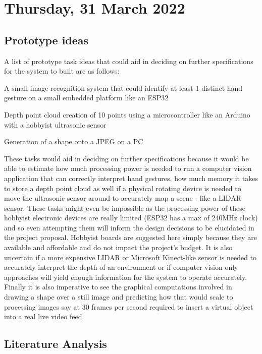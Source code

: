 \section[2022/03/31]{Thursday, 31 March 2022}

\subsection{Prototype ideas}

A list of prototype task ideas that could aid in deciding on further specifications for the system to built are as follows:
\begin{compactitem}
    \item A small image recognition system that could identify at least 1 distinct hand gesture on a small embedded platform like an ESP32
    \item Depth point cloud creation of 10 points using a microcontroller like an Arduino with a hobbyist ultrasonic sensor
    \item Generation of a shape onto a JPEG on a PC
\end{compactitem}

These tasks would aid in deciding on further specifications because it would be able to estimate how much processing power is needed to run a computer vision application that can correctly interpret hand gestures, how much memory it takes to store a depth point cloud as well if a physical rotating device is needed to move the ultrasonic sensor around to accurately map a scene - like a LIDAR sensor. These tasks might even be impossible as the processing power of these hobbyist electronic devices are really limited (ESP32 has a max of 240MHz clock) and so even attempting them will inform the design decisions to be elucidated in the project proposal. Hobbyist boards are suggested here simply because they are available and affordable and do not impact the project's budget. It is also uncertain if a more expensive LIDAR or Microsoft Kinect-like sensor is needed to accurately interpret the depth of an environment or if computer vision-only approaches will yield enough information for the system to operate accurately. Finally it is also imperative to see the graphical computations involved in drawing a shape over a still image and predicting how that would scale to processing images say at 30 frames per second required to insert a virtual object into a real live video feed.\newline

\subsection{Literature Analysis}

